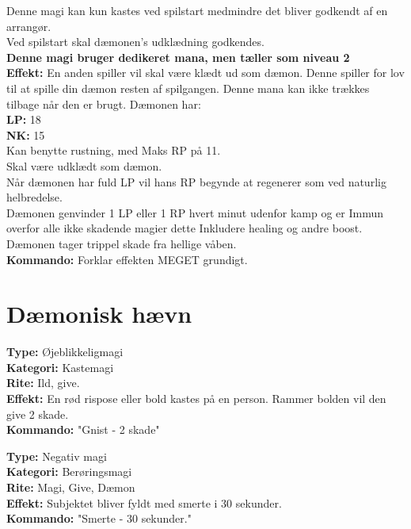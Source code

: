 \begin{sjæl*}
Denne magi kan kun kastes ved spilstart medmindre det bliver godkendt af en arrangør.\\
Ved spilstart skal dæmonen's udklædning godkendes.\\
\textbf{Denne magi bruger dedikeret mana, men tæller som niveau 2}\\
\textbf{Effekt:} En anden spiller vil skal være klædt ud som dæmon. Denne spiller for lov til at spille din dæmon resten af spilgangen. Denne mana kan ikke trækkes tilbage når den er brugt.
Dæmonen har:\\
\textbf{LP:} 18\\
\textbf{NK:} 15\\
Kan benytte rustning, med Maks RP på 11.\\
Skal være udklædt som dæmon.\\
Når dæmonen har fuld LP vil hans RP begynde at regenerer som ved naturlig helbredelse.\\ 
Dæmonen genvinder 1 LP eller 1 RP hvert minut udenfor kamp og er Immun overfor alle ikke skadende magier dette Inkludere healing og andre boost.\\
Dæmonen tager trippel skade fra hellige våben.\\
\textbf{Kommando:} Forklar effekten MEGET grundigt.
\end{sjæl*}

\section{Dæmonisk hævn}

\begin{dHævn*}[Gnist]
\textbf{Type:} Øjeblikkeligmagi\\
\textbf{Kategori:} Kastemagi\\
\textbf{Rite:} Ild, give.\\
\textbf{Effekt:} En rød rispose eller bold kastes på en person. Rammer bolden vil den give 2 skade.\\
\textbf{Kommando:} "Gnist - 2 skade"
\end{dHævn*}

\begin{dHævn*}[Smerte]
\textbf{Type:} Negativ magi\\
\textbf{Kategori:} Berøringsmagi\\
\textbf{Rite:} Magi, Give, Dæmon\\
\textbf{Effekt:} Subjektet bliver fyldt med smerte i 30 sekunder.\\
\textbf{Kommando:} "Smerte - 30 sekunder."
\end{dHævn*}

